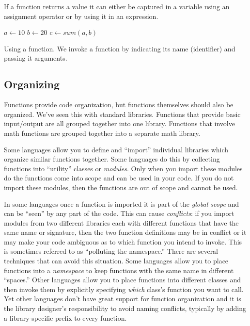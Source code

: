 If a function returns a value it can either be captured in a variable using an
assignment operator or by using it in an expression.  

\begin{algorithm}[H]
$a \leftarrow 10$ \;
$b \leftarrow 20$ \;
$c \leftarrow sum(a, b)$ \;
\caption[Using a function]{Using a function.  We invoke a function by 
indicating its name (identifier) and passing it arguments.}
\label{algorithm:functionCall}
\end{algorithm}

\subsection{Organizing}   

Functions provide code organization, but functions themselves should also
be organized.  We've seen this with standard libraries.  Functions that provide
basic input/output are all grouped together into one library.  
Functions that involve math functions are grouped together into a separate math library.

Some languages allow you to define and ``import'' individual libraries 
which organize similar functions together.  Some languages do this by 
collecting functions into ``utility'' classes or \emph{modules}.  Only when
you import these modules do the functions come into scope and can be
used in your code.  If you do not import these modules, then the functions
are out of scope and cannot be used.  

In some languages once a function is imported it is part of the 
 
\emph{global scope} and can be ``seen'' by any part of the code.  This can cause
\emph{conflicts}: if you import modules from two different libraries each
with different functions that have the same name or signature, then 
the two function definitions may be in conflict or it may make your
code ambiguous as to which function you intend to invoke.  This is
sometimes referred to as ``polluting the namespace.''  There are
several techniques that can avoid this situation.  Some languages allow
you to place functions into a \emph{namespace} to keep functions with
the same name in different ``spaces.''  Other languages allow you to 
place functions into different classes and then invoke them by explicitly
specifying \emph{which} class's function you want to call.  Yet other
languages don't have great support for function organization and it is
the library designer's responsibility to avoid naming conflicts, typically
by adding a library-specific prefix to every function.

